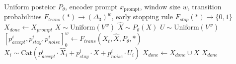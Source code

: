 \begin{algorithm}[t]
\caption{Generic Adaptive-Order Sampler}
\label{alg:gen-adapt}
\begin{algorithmic}[1]
\Require Uniform posteior $P_\theta$, encoder prompt $x_{\mathrm{prompt}}$, window size $w$, transition probabilities $F_{trans}(*) \to  (\Delta_{3})^w$, early stopping rule $F_{stop}(*) \to \{0, 1\}$
\State $X_{done} \gets X_{prompt}$
    \State $X \sim \text{Uniform}(V^w)$
        \State $\hat{X} \sim P_{\theta}(X)$
        \State $U \sim \text{Uniform}(V^w)$
        \State $[p_{accept}^i, p_{stay}^i, p_{noise}^i]_0^w \gets F_{trans}(X_t, \hat{X}, P_{\theta}, *)$
        \State $X_i \sim \text{Cat} \left( p_{accept}^i \cdot \hat{X}_i +  p_{stay}^i \cdot X + p_{noise}^i \cdot U_i\right)$
    \EndWhile
    \State $X_{done} \gets X_{done} \cup X$
\EndWhile
\State \Return $X_{done}$
\end{algorithmic}
\end{algorithm} 